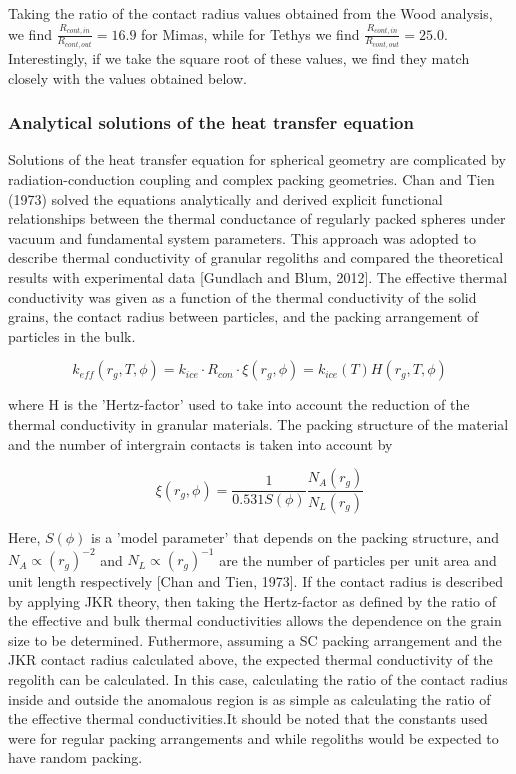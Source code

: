 \documentclass[11pt]{article} %
\begin{document}
	
	Taking the ratio of the contact radius values obtained from the Wood analysis, we find $\frac{R_{cont,in}}{R_{cont,out}} = 16.9$ for Mimas, while for Tethys we find $\frac{R_{cont,in}}{R_{cont,out}} = 25.0$. Interestingly, if we take the square root of these values, we find they match closely with the values obtained below.
	
\subsubsection{Analytical solutions of the heat transfer equation}

	Solutions of the heat transfer equation for spherical geometry are complicated by radiation-conduction coupling and complex packing geometries. Chan and Tien (1973) solved the equations analytically and derived explicit functional relationships between the thermal conductance of regularly packed spheres under vacuum and fundamental system parameters. This approach was adopted to describe thermal conductivity of granular regoliths and compared the theoretical results with experimental data [Gundlach and Blum, 2012]. The effective thermal conductivity was given as a function of the thermal conductivity of the solid grains, the contact radius between particles, and the packing arrangement of particles in the bulk.
	
	\begin{equation}
	k_{eff}(r_{g}, T, \phi) = k_{ice}\cdot R_{con} \cdot \xi(r_{g}, \phi)= k_{ice}(T) H(r_{g},T, \phi)
	\end{equation}

	where H is the 'Hertz-factor' used to take into account the reduction of the thermal conductivity in granular materials. The packing structure of the material and the number of intergrain contacts is taken into account by

	\begin{equation}
	\xi(r_{g}, \phi) = \frac{1}{0.531 S(\phi)} \frac{N_{A}(r_{g})}{N_{L}(r_{g})}
	\end{equation}

	Here, $S(\phi)$ is a 'model parameter' that depends on the packing structure, and $N_{A} \varpropto (r_{g})^{-2}$ and $N_{L} \varpropto (r_{g})^{-1}$ are the number of particles per unit area and unit length respectively [Chan and Tien, 1973]. If the contact radius is described by applying JKR theory, then taking the Hertz-factor as defined by the ratio of the effective and bulk thermal conductivities allows the dependence on the grain size to be determined. Futhermore, assuming a SC packing arrangement and the JKR contact radius calculated above, the expected thermal conductivity of the regolith can be calculated. In this case, calculating the ratio of the contact radius inside and outside the anomalous region is as simple as calculating the ratio of the effective thermal conductivities.It should be noted that the constants used were for regular packing arrangements and while regoliths would be expected to have random packing.
	
\end{document}
